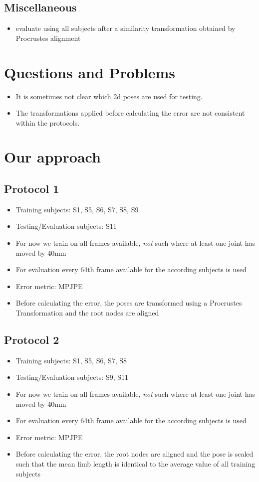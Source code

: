 \subsection{Miscellaneous}
\begin{itemize}
	\item \cite{jahangiri17} evaluate using all subjects after a similarity transformation obtained by Procrustes alignment
\end{itemize}

\section{Questions and Problems}
\begin{itemize}
	\item It is sometimes not clear which 2d poses are used for testing.
	\item The transformations applied before calculating the error are not consistent within the protocols.
\end{itemize}


\section{Our approach}
	\subsection{Protocol 1}
		\begin{itemize}
			\item Training subjects: S1, S5, S6, S7, S8, S9
			\item Testing/Evaluation subjects: S11
			\item For now we train on all frames available, \emph{not} such where at least one joint has moved by 40mm
			\item For evaluation every 64th frame available for the according subjects is used
			\item Error metric: MPJPE
			\item Before calculating the error, the poses are transformed using a Procrustes Transformation and the root nodes are aligned
		\end{itemize}
	\subsection{Protocol 2}
		\begin{itemize}
			\item Training subjects: S1, S5, S6, S7, S8
			\item Testing/Evaluation subjects: S9, S11
			\item For now we train on all frames available, \emph{not} such where at least one joint has moved by 40mm
			\item For evaluation every 64th frame available for the according subjects is used
			\item Error metric: MPJPE
			\item Before calculating the error, the root nodes are aligned and the pose is scaled such that the mean limb length is identical to the average value of all training subjects
		\end{itemize}
